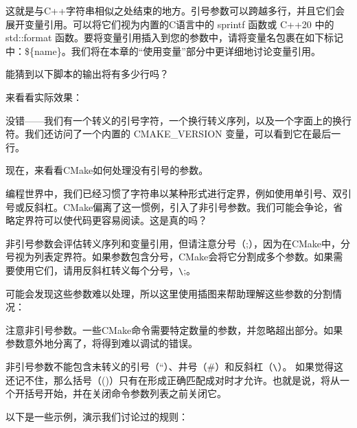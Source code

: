 这就是与C++字符串相似之处结束的地方。引号参数可以跨越多行，并且它们会展开变量引用。可以将它们视为内置的C语言中的 sprintf 函数或 C++20 中的 std::format 函数。要将变量引用插入到您的参数中，请将变量名包裹在如下标记中：\$\{name\}。我们将在本章的“使用变量”部分中更详细地讨论变量引用。

能猜到以下脚本的输出将有多少行吗？



来看看实际效果：


没错——我们有一个转义的引号字符，一个换行转义序列，以及一个字面上的换行符。我们还访问了一个内置的 CMAKE\_VERSION 变量，可以看到它在最后一行。

现在，来看看CMake如何处理没有引号的参数。


编程世界中，我们已经习惯了字符串以某种形式进行定界，例如使用单引号、双引号或反斜杠。CMake偏离了这一惯例，引入了非引号参数。我们可能会争论，省略定界符可以使代码更容易阅读。这是真的吗？

非引号参数会评估转义序列和变量引用，但请注意分号（;），因为在CMake中，分号视为列表定界符。如果参数包含分号，CMake会将它分割成多个参数。如果需要使用它们，请用反斜杠转义每个分号，\verb|\|;。

可能会发现这些参数难以处理，所以这里使用插图来帮助理解这些参数的分割情况：


注意非引号参数。一些CMake命令需要特定数量的参数，并忽略超出部分。如果参数意外地分离了，将得到难以调试的错误。

非引号参数不能包含未转义的引号（“）、井号（\#）和反斜杠（\verb|\|）。 如果觉得这还记不住，那么括号（()）只有在形成正确匹配成对时才允许。也就是说，将从一个开括号开始，并在关闭命令参数列表之前关闭它。

以下是一些示例，演示我们讨论过的规则：

